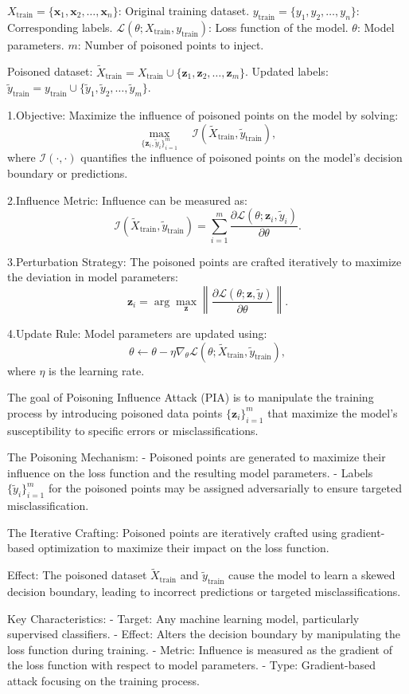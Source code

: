 $X_{\text{train}} = \{\mathbf{x}_1, \mathbf{x}_2, \ldots, \mathbf{x}_n\}$: Original training dataset.
$y_{\text{train}} = \{y_1, y_2, \ldots, y_n\}$: Corresponding labels.
$\mathcal{L}(\theta; X_{\text{train}}, y_{\text{train}})$: Loss function of the model.
$\theta$: Model parameters.
$m$: Number of poisoned points to inject.

Poisoned dataset: $\tilde{X}_{\text{train}} = X_{\text{train}} \cup \{\mathbf{z}_1, \mathbf{z}_2, \ldots, \mathbf{z}_m\}$.
Updated labels: $\tilde{y}_{\text{train}} = y_{\text{train}} \cup \{\tilde{y}_1, \tilde{y}_2, \ldots, \tilde{y}_m\}$.

1.Objective:  
   Maximize the influence of poisoned points on the model by solving:
   \[
   \max_{\{\mathbf{z}_i, \tilde{y}_i\}_{i=1}^m} \quad \mathcal{I}(\tilde{X}_{\text{train}}, \tilde{y}_{\text{train}}),
   \]
   where $\mathcal{I}(\cdot, \cdot)$ quantifies the influence of poisoned points on the model's decision boundary or predictions.

2.Influence Metric:  
   Influence can be measured as:
   \[
   \mathcal{I}(\tilde{X}_{\text{train}}, \tilde{y}_{\text{train}}) = \sum_{i=1}^m \frac{\partial \mathcal{L}(\theta; \mathbf{z}_i, \tilde{y}_i)}{\partial \theta}.
   \]

3.Perturbation Strategy:  
   The poisoned points are crafted iteratively to maximize the deviation in model parameters:
   \[
   \mathbf{z}_i = \arg \max_{\mathbf{z}} \left\| \frac{\partial \mathcal{L}(\theta; \mathbf{z}, \tilde{y})}{\partial \theta} \right\|.
   \]

4.Update Rule:  
   Model parameters are updated using:
   \[
   \theta \leftarrow \theta - \eta \nabla_\theta \mathcal{L}(\theta; \tilde{X}_{\text{train}}, \tilde{y}_{\text{train}}),
   \]
   where $\eta$ is the learning rate.

The goal of Poisoning Influence Attack (PIA) is to manipulate the training process by introducing poisoned data points $\{\mathbf{z}_i\}_{i=1}^m$ that maximize the model's susceptibility to specific errors or misclassifications.

The Poisoning Mechanism:
   - Poisoned points are generated to maximize their influence on the loss function and the resulting model parameters.
   - Labels $\{\tilde{y}_i\}_{i=1}^m$ for the poisoned points may be assigned adversarially to ensure targeted misclassification.

The Iterative Crafting: Poisoned points are iteratively crafted using gradient-based optimization to maximize their impact on the loss function.

Effect: The poisoned dataset $\tilde{X}_{\text{train}}$ and $\tilde{y}_{\text{train}}$ cause the model to learn a skewed decision boundary, leading to incorrect predictions or targeted misclassifications.

Key Characteristics:
- Target: Any machine learning model, particularly supervised classifiers.
- Effect: Alters the decision boundary by manipulating the loss function during training.
- Metric: Influence is measured as the gradient of the loss function with respect to model parameters.
- Type: Gradient-based attack focusing on the training process.